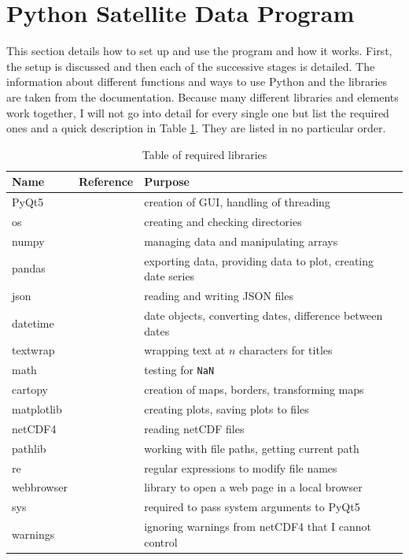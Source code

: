 \documentclass[../00_main.tex]{subfiles}
\begin{document}
\section{Python Satellite Data Program}

This section details how to set up and use the program and how it works.
First, the setup is discussed and then each of the successive stages is
detailed. The information about different functions and ways to use Python and
the libraries are taken from the documentation. Because many different
libraries and elements work together, I will not go into detail for every 
single one but list the required ones and a quick description in Table
\ref{tab:01}. They are 
listed in no particular order.
\begin{table}[H]
    \center
\begin{tabular}{| l | l | l |}\hline
    Name & Reference        & Purpose       \\\hline\hline
    PyQt5 & \cite{pyqt} & creation of GUI, handling of threading\\\hline
    os &\cite{py-os}   & creating and checking directories\\\hline
    numpy &\cite{py-numpy} & managing data and manipulating arrays\\\hline
    pandas& \cite{pandas}  & exporting data, providing data to plot, creating
                            date series\\\hline
    json &\cite{py-json}   & reading and writing JSON files\\\hline
    datetime &\cite{py-datetime} & date objects, converting dates, difference
                                  between dates\\\hline
    textwrap& \cite{py-textwrap} & wrapping text at $n$ characters for titles\\\hline
    math &\cite{py-math}         & testing for \texttt{NaN}\\\hline
    cartopy &\cite{py-cartopy}   & creation of maps, borders, transforming maps\\\hline
    matplotlib & \cite{py-mpl}    & creating plots, saving plots to files\\\hline
    netCDF4 &\cite{netcdf4}      & reading netCDF files\\\hline
    pathlib &\cite{pathlib}      & working with file paths, getting current path\\\hline
    re &\cite{py-re}             & regular expressions to modify file names\\\hline
    webbrowser & \cite{browser}   & library to open a web page in a local browser\\\hline
    sys &\cite{py-sys}           & required to pass system arguments to PyQt5\\\hline
    warnings & \cite{warnings}    & ignoring warnings from netCDF4 that I cannot control\\\hline
\end{tabular}
    \caption{Table of required libraries}
    \label{tab:01}
\end{table}
\end{document}
